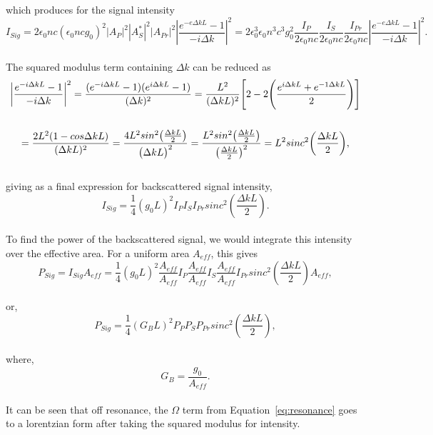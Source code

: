 which produces for the signal intensity
\\
\begin{equation}
  I_{Sig} = 2\epsilon_{0}nc(\epsilon_{0}ncg_{0})^{2}|A_{P}|^{2}|A_{S}^{*}|^{2}|A_{Pr}|^{2}\left|\frac{e^{-e\Delta kL} - 1}{-i\Delta k}\right|^{2}
  = 2\epsilon_{0}^{3}\epsilon_{0}n^{3}c^{3}g_{0}^{2}\frac{I_{P}}{2\epsilon_{0}nc}\frac{I_{S}}{2\epsilon_{0}nc}\frac{I_{Pr}}{2\epsilon_{0}nc}\left|\frac{e^{-e\Delta kL} - 1}{-i\Delta k}\right|^{2}.
\end{equation}
\\
The squared modulus term containing \(\Delta k\) can be reduced as
\\
\begin{gather}
  \bigg|\frac{e^{-i\Delta kL} - 1}{-i\Delta k}\bigg|^{2} = \frac{(e^{-i\Delta kL} - 1)(e^{i\Delta kL} - 1)}{(\Delta k)^{2}} = \frac{L^{2}}{(\Delta kL)^{2}}\Bigg[ 2 - 2\Bigg(\frac{e^{i\Delta kL} + e^{-1\Delta kL}}{2}\Bigg)\Bigg] \notag \\ \notag \\
  = \frac{2L^{2}(1 - cos\Delta kL)}{(\Delta kL)^{2}} = \frac{4L^{2}sin^{2}\big(\frac{\Delta kL}{2}\big)}{\big(\Delta kL\big)^{2}} = \frac{L^{2}sin^{2}\big(\frac{\Delta kL}{2}\big)}{\big(\frac{\Delta kL}{2}\big)^{2}} = L^{2}sinc^{2}\bigg(\frac{\Delta kL}{2}\bigg),
\end{gather}
\\
giving as a final expression for backscattered signal intensity,
\\
\begin{equation}
I_{Sig} = \frac{1}{4}(g_{0}L)^{2}I_{P}I_{S}I_{Pr}sinc^{2}\left(\frac{\Delta kL}{2}\right).
\end{equation}
\\

To find the power of the backscattered signal, we would integrate this intensity over the effective area. For a uniform area \(A_{eff}\), this gives
\\
\begin{equation}
  P_{Sig} = I_{Sig}A_{eff} = \frac{1}{4}(g_{0}L)^{2}\frac{A_{eff}}{A_{eff}}I_{P}\frac{A_{eff}}{A_{eff}}I_{S}\frac{A_{eff}}{A_{eff}}I_{Pr}sinc^{2}\left(\frac{\Delta kL}{2}\right)A_{eff},
\end{equation}
\\
or,
\\
\begin{equation}
  P_{Sig} = \frac{1}{4}(G_{B}L)^{2}P_{P}P_{S}P_{Pr}sinc^{2}\left(\frac{\Delta kL}{2}\right),
\end{equation}
\\
where,
\\
\begin{equation}
  G_{B} = \frac{g_{0}}{A_{eff}}.
\end{equation}
\\
It can be seen that off resonance, the \(\Omega\) term from Equation~\ref{eq:resonance} goes to a lorentzian form after taking the squared modulus for intensity.

